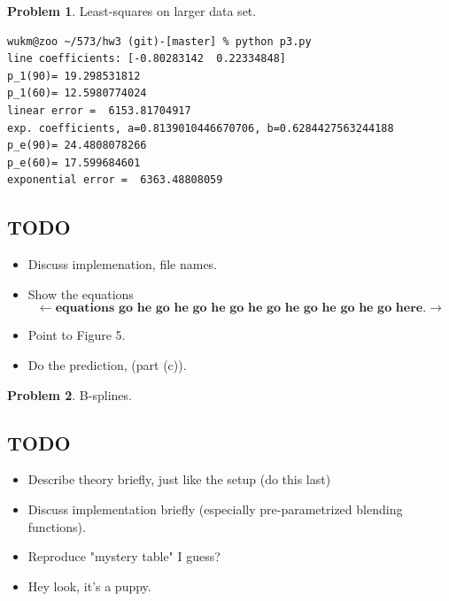 \documentclass[10pt]{article}
\theoremstyle{plain}
\theoremstyle{definition}
\newtheorem{prob}{Problem}
\numberwithin{equation}{section}
\begin{document}
\begin{prob} Least-squares on larger data set.


\begin{verbatim}
wukm@zoo ~/573/hw3 (git)-[master] % python p3.py
line coefficients: [-0.80283142  0.22334848]
p_1(90)= 19.298531812
p_1(60)= 12.5980774024
linear error =  6153.81704917
exp. coefficients, a=0.8139010446670706, b=0.6284427563244188
p_e(90)= 24.4808078266
p_e(60)= 17.599684601
exponential error =  6363.48808059
\end{verbatim}

\subsection*{TODO}
    \begin{itemize}
    \item Discuss implemenation, file names.
    \item Show the equations
        \[
            \leftarrow \textbf{equations go he go he go he go he go he go he go he go here}. \rightarrow
        \]
    \item Point to Figure 5.
    \item Do the prediction, (part (c)).
    \end{itemize}
\end{prob}

\hrulefill

\begin{prob} B-splines.
    
    \subsection*{TODO}
    \begin{itemize}
        \item Describe theory briefly, just like the setup (do this last)
        \item Discuss implementation briefly (especially pre-parametrized blending functions).
        \item Reproduce "mystery table" I guess?
        \item Hey look, it's a puppy.
    \end{itemize}

\end{prob}

\end{document}
